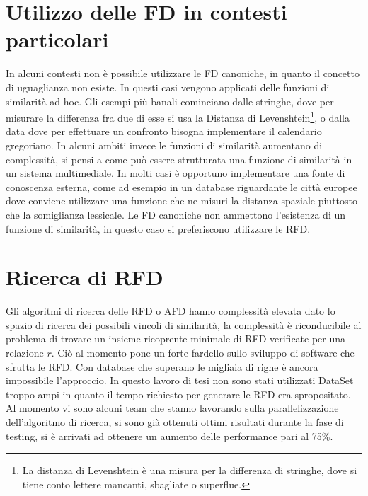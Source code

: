 \section{Utilizzo delle FD in contesti particolari}

In alcuni contesti non è possibile utilizzare le FD canoniche, in quanto il concetto di uguaglianza non esiste. In questi casi vengono applicati delle funzioni di similarità ad-hoc. Gli esempi più banali cominciano dalle stringhe, dove per misurare la differenza fra due di esse si usa la Distanza di Levenshtein\footnote{La distanza di Levenshtein è una misura per la differenza di stringhe, dove si tiene conto lettere mancanti, sbagliate o superflue.}, o dalla data  dove per effettuare un confronto bisogna implementare il calendario gregoriano. In alcuni ambiti invece le funzioni di similarità aumentano di complessità, si pensi a come può essere strutturata una funzione di similarità in un sistema multimediale. In molti casi è opportuno implementare una fonte di conoscenza esterna, come ad esempio in un database riguardante le città europee dove conviene utilizzare una funzione che ne misuri la distanza spaziale piuttosto che la somiglianza lessicale. Le FD canoniche non ammettono l'esistenza di un funzione di similarità, in questo caso si preferiscono utilizzare le RFD.

\section{Ricerca di RFD}
Gli algoritmi di ricerca delle RFD o AFD hanno complessità elevata dato lo spazio di ricerca dei possibili vincoli di similarità, la complessità è riconducibile al problema di trovare un insieme ricoprente minimale di RFD verificate per una relazione $r$. Ciò al momento pone un forte fardello sullo sviluppo di software che sfrutta le RFD. Con database che superano le migliaia di righe è ancora impossibile l’approccio. In questo lavoro di tesi non sono stati utilizzati DataSet troppo ampi in quanto il tempo richiesto per generare le RFD era spropositato. Al momento vi sono alcuni team che stanno lavorando sulla parallelizzazione dell'algoritmo di ricerca, si sono già ottenuti ottimi risultati durante la fase di testing, si è arrivati ad ottenere un aumento delle performance pari al 75\%.


